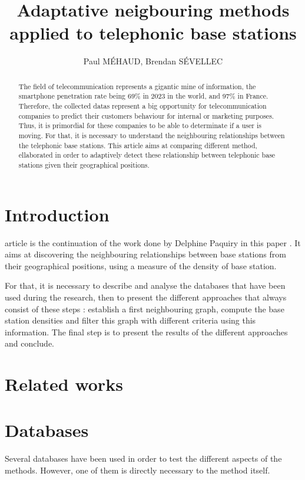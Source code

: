 \documentclass[lettersize,journal,english]{IEEEtran}
\title{Adaptative neigbouring methods applied to telephonic base stations}
\author{Paul MÉHAUD, Brendan SÉVELLEC}
\begin{document}
\maketitle

\begin{abstract}
  The field of telecommunication represents a gigantic mine of information, the smartphone penetration rate being 69\%
  in 2023 in the world, and 97\% in France. Therefore, the collected datas represent a big opportunity for telecommunication
  companies to predict their customers behaviour for internal or marketing purposes. Thus, it is primordial for these companies
  to be able to determinate if a user is moving. For that, it is necessary to understand the neighbouring relationships between the 
  telephonic base stations. This article aims at comparing different method, ellaborated in order to adaptively detect these
  relationship between telephonic base stations given their geographical positions.
\end{abstract}

\section{Introduction}
     article is the continuation of the work done by Delphine Paquiry in this paper \cite{art_del_paq}.
    It aims at discovering the neighbouring relationships between base stations from their geographical positions, using a 
    measure of the density of base station.

    For that, it is necessary to describe and analyse the databases that have been used during the research, then to present 
    the different approaches that always consist of these steps : establish a first neighbouring graph, compute the base station 
    densities and filter this graph with different criteria using this information. The final step is to present the results
    of the different approaches and conclude.
\section{Related works}

\section{Databases}
    Several databases have been used in order to test the different aspects of the methods. However, one of
    them is directly necessary to the method itself.
\end{document}
